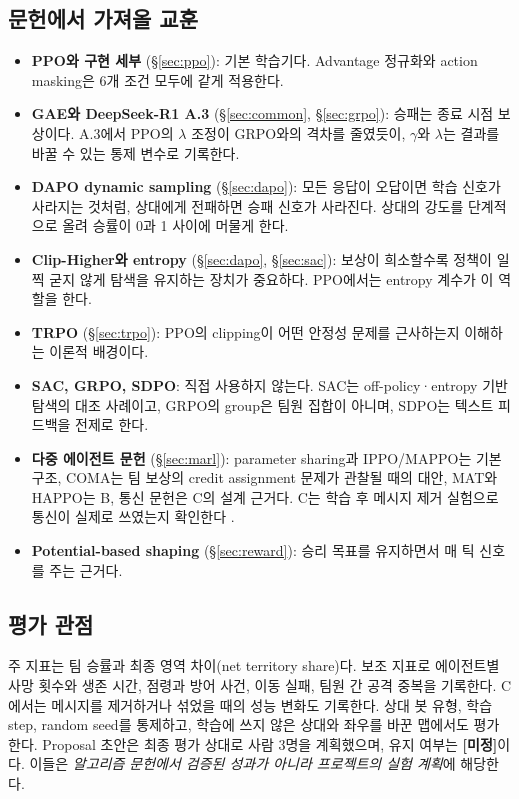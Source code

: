 \documentclass[11pt,a4paper]{article}
\newcommand{\TBD}{\textbf{[미정]}}
\begin{document}
\subsection{문헌에서 가져올 교훈}
\begin{itemize}
 \item \textbf{PPO와 구현 세부} (\S\ref{sec:ppo}): 기본 학습기다. Advantage 정규화와 action masking은 6개 조건 모두에 같게 적용한다.
 \item \textbf{GAE와 DeepSeek-R1 A.3} (\S\ref{sec:common}, \S\ref{sec:grpo}): 승패는 종료 시점 보상이다. A.3에서 PPO의 \(\lambda\) 조정이 GRPO와의 격차를 줄였듯이, \(\gamma\)와 \(\lambda\)는 결과를 바꿀 수 있는 통제 변수로 기록한다.
 \item \textbf{DAPO dynamic sampling} (\S\ref{sec:dapo}): 모든 응답이 오답이면 학습 신호가 사라지는 것처럼, 상대에게 전패하면 승패 신호가 사라진다. 상대의 강도를 단계적으로 올려 승률이 0과 1 사이에 머물게 한다.
 \item \textbf{Clip-Higher와 entropy} (\S\ref{sec:dapo}, \S\ref{sec:sac}): 보상이 희소할수록 정책이 일찍 굳지 않게 탐색을 유지하는 장치가 중요하다. PPO에서는 entropy 계수가 이 역할을 한다.
 \item \textbf{TRPO} (\S\ref{sec:trpo}): PPO의 clipping이 어떤 안정성 문제를 근사하는지 이해하는 이론적 배경이다.
 \item \textbf{SAC, GRPO, SDPO}: 직접 사용하지 않는다. SAC는 off-policy·entropy 기반 탐색의 대조 사례이고, GRPO의 group은 팀원 집합이 아니며, SDPO는 텍스트 피드백을 전제로 한다.
 \item \textbf{다중 에이전트 문헌} (\S\ref{sec:marl}): parameter sharing과 IPPO/MAPPO는 기본 구조, COMA는 팀 보상의 credit assignment 문제가 관찰될 때의 대안, MAT와 HAPPO는 B, 통신 문헌은 C의 설계 근거다. C는 학습 후 메시지 제거 실험으로 통신이 실제로 쓰였는지 확인한다 \cite{lowe2019}.
 \item \textbf{Potential-based shaping} (\S\ref{sec:reward}): 승리 목표를 유지하면서 매 틱 신호를 주는 근거다.
\end{itemize}

\subsection{평가 관점}
주 지표는 팀 승률과 최종 영역 차이(net territory share)다. 보조 지표로 에이전트별 사망 횟수와 생존 시간, 점령과 방어 사건, 이동 실패, 팀원 간 공격 중복을 기록한다. C에서는 메시지를 제거하거나 섞었을 때의 성능 변화도 기록한다. 상대 봇 유형, 학습 step, random seed를 통제하고, 학습에 쓰지 않은 상대와 좌우를 바꾼 맵에서도 평가한다. Proposal 초안은 최종 평가 상대로 사람 3명을 계획했으며, 유지 여부는 \TBD{}이다. 이들은 \emph{알고리즘 문헌에서 검증된 성과가 아니라 프로젝트의 실험 계획}에 해당한다.
\end{document}
